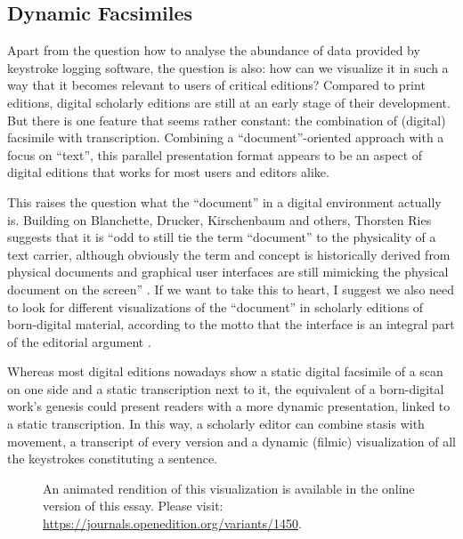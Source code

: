 \begin{paper}
\section*{Dynamic Facsimiles}

Apart from the question how to analyse the abundance of data provided by
keystroke logging software, the question is also: how can we visualize
it in such a way that it becomes relevant to users of critical editions?
Compared to print editions, digital scholarly editions are still at an
early stage of their development. But there is one feature that seems
rather constant: the combination of (digital) facsimile with
transcription. Combining a ``document''-oriented approach with a focus on
``text'', this parallel presentation format appears to be an aspect of
digital editions that works for most users and editors alike.

This raises the question what the ``document'' in a digital environment
actually is. Building on Blanchette, Drucker, Kirschenbaum and others,
Thorsten Ries suggests that it is ``odd to still tie the term ``document''
to the physicality of a text carrier, although obviously the term and
concept is historically derived from physical documents and graphical
user interfaces are still mimicking the physical document on the
screen'' \citep[397]{ries_rationale_2018}. If we want to take this to heart, I suggest
we also need to look for different visualizations of the ``document'' in
scholarly editions of born-digital material, according to the motto that
the interface is an integral part of the editorial argument \citep{andrews_what_2018,bleeker_interfacing_2018,bleier_discussing_2018,dillen_editor_2018,schauble_encodings_2018}.

Whereas most digital editions nowadays show a static digital facsimile
of a scan on one side and a static transcription next to it, the
equivalent of a born-digital work's genesis could present readers with a
more dynamic presentation, linked to a static transcription. In this
way, a scholarly editor can combine stasis with movement, a transcript
of every version and a dynamic (filmic) visualization of all the
keystrokes constituting a sentence.


\begin{figure}[!ht]
    \centering
    \caption{An animated rendition of this visualization is available in the online version of this essay. Please visit: \url{https://journals.openedition.org/variants/1450}.}
    \label{fig:vanhulle:jane1}
\end{figure}




\end{paper}
